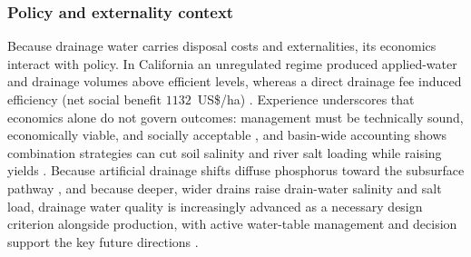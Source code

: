 \subsubsection{Policy and externality context}

Because drainage water carries disposal costs and externalities, its economics
interact with policy. In California an unregulated regime produced applied-water
and drainage volumes above efficient levels, whereas a direct drainage fee
induced efficiency (net social benefit $1132$~US\$/ha)
\parencite{DINAR1989}. Experience underscores that economics alone do not govern
outcomes: management must be technically sound, economically viable, and socially
acceptable \parencite{Letey1999}, and basin-wide accounting shows combination
strategies can cut soil salinity and river salt loading while raising yields
\parencite{Burkhalter2006,Quinn2009,McDowell2021}. Because artificial drainage
shifts diffuse phosphorus toward the subsurface pathway
\parencite{Lucci2014,Allaire2011,Dadfar2010}, and because deeper, wider drains
raise drain-water salinity and salt load, drainage water quality is increasingly
advanced as a necessary design criterion alongside production, with active
water-table management and decision support the key future directions
\parencite{Ayars2015,Yannopoulos2020,Ritzema2023}.